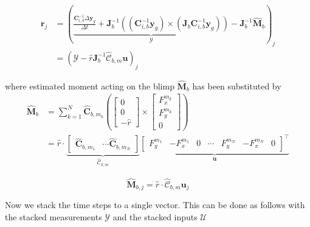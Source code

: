 \begin{equation}
\label{eqn_objective_short}
\begin{aligned}
\mathbf{r}_j &= \left(
\underbrace{
\frac{\mathbf{C}_{i,b}^{-1} \Delta \mathbf{y}_g}{\Delta t} + \mathbf{J}_b^{-1} \left( \left( \mathbf{C}_{i,b}^{-1} \mathbf{y}_g \right) \times \left(\mathbf{J}_b \mathbf{C}_{i,b}^{-1} \mathbf{y}_g \right) \right)}_\mathcal{Y}
 - \mathbf{J}_b^{-1} \hat{\mathbf{M}}_b \right)_j \\
 &= \left( \mathcal{Y} - \hat{r} \mathbf{J}_b^{-1} \hat{\mathcal{C}}_{b,m} \mathbf{u} \right)_j
\end{aligned}
\end{equation}

where estimated moment acting on the blimp $\hat{\mathbf{M}}_b$ has been substituted by
\begin{equation}
\label{eqn_est_moment_reduction}
\begin{aligned}
\hat{\mathbf{M}}_b &= \sum_{k=1}^N { \hat{\mathbf{C}}_{b,m_k} \left(
\left[ \begin{array}{c}
0 \\ 0 \\ - \hat{r}
\end{array} \right]
\times 
\left[ \begin{array}{c}
F^{m_k}_x \\ F^{m_k}_y \\ 0
\end{array} \right]
\right)} \\
&= \hat{r} \cdot \underbrace{ \left[
\begin{array}{ccc}
\hat{\mathbf{C}}_{b,m_1} & \cdots \hat{\mathbf{C}}_{b,m_N}
\end{array}
\right] }_{\hat{\mathcal{C}}_{b,m}}
\underbrace{ \left[
\begin{array}{ccccccc}
 F^{m_1}_y & - F^{m_1}_x & 0 & \cdots &F^{m_N}_y & -  F^{m_N}_x & 0 
\end{array}
\right]^\top }_{\mathbf{u}}
\end{aligned}
\end{equation}

\begin{equation}
\hat{\mathbf{M}}_{b,j} = \hat{r} \cdot \hat{\mathcal{C}}_{b,m} \mathbf{u}_j
\end{equation}

Now we stack the time steps to a single vector. This can be done as follows with the stacked measurements $\mathcal{Y}$ and the stacked inputs $\mathcal{U}$

